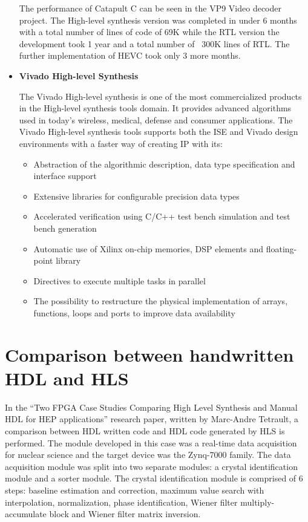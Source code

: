 \documentclass{cup-pan}
\begin{document}
\begin{itemize}
	The performance of Catapult C can be seen in the VP9 Video decoder project. The High-level synthesis version was completed in under 6 months with a total number of lines of code of 69K while the RTL version the development took 1 year and a total number of ~300K lines of RTL. The further implementation of HEVC took only 3 more months.
	
    \item  \textbf{Vivado High-level Synthesis}
    
    The Vivado High-level synthesis is one of the most commercialized products in the High-level synthesis tools domain. It provides advanced algorithms used in today's wireless, medical, defense and consumer applications. The Vivado High-level synthesis tools supports both the ISE and Vivado design environments with a faster way of creating IP with its:
    
    \begin{itemize}
        \item  Abstraction of the algorithmic description, data type specification and interface support
        \item  Extensive libraries for configurable precision data types
        \item  Accelerated verification using C/C++ test bench simulation and test bench generation
        \item  Automatic use of Xilinx on-chip memories, DSP elements and floating-point library
        \item  Directives to execute multiple tasks in parallel 
        \item  The possibility to restructure the physical implementation of arrays, functions, loops and ports to improve data availability
    \end{itemize}
\end{itemize}

\section{Comparison between handwritten HDL and HLS}
\label{sec:overview}
In the “Two FPGA Case Studies Comparing High Level Synthesis and Manual HDL for HEP applications” research paper, written by Marc-Andre Tetrault, a comparison between HDL written code and HDL code generated by HLS is performed. The module developed in this case was a real-time data acquisition for nuclear science and the target device was the Zynq-7000 family. The data acquisition module was split into two separate modules: a crystal identification module and a sorter module. The crystal identification module is comprised of 6 steps: baseline estimation and correction, maximum value search with interpolation, normalization, phase identification, Wiener filter multiply-accumulate block and Wiener filter matrix inversion.
\end{document}
